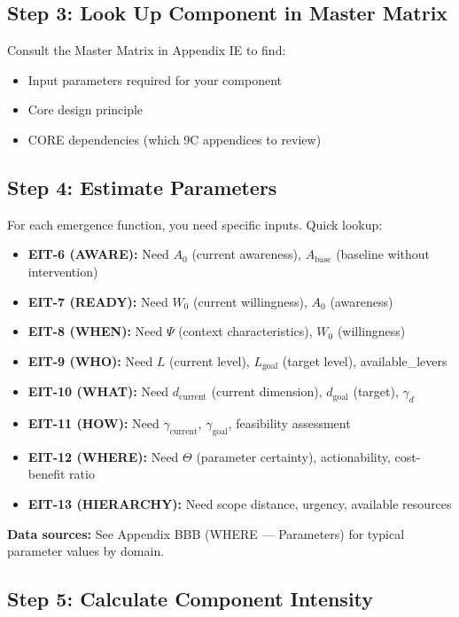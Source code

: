 \subsection{Step 3: Look Up Component in Master Matrix}

Consult the Master Matrix in Appendix IE to find:
\begin{itemize}[nosep]
\item Input parameters required for your component
\item Core design principle
\item CORE dependencies (which 9C appendices to review)
\end{itemize}

\subsection{Step 4: Estimate Parameters}

For each emergence function, you need specific inputs. Quick lookup:

\begin{itemize}
\item \textbf{EIT-6 (AWARE):} Need $A_0$ (current awareness), $A_{\text{base}}$ (baseline without intervention)
\item \textbf{EIT-7 (READY):} Need $W_0$ (current willingness), $A_0$ (awareness)
\item \textbf{EIT-8 (WHEN):} Need $\Psi$ (context characteristics), $W_0$ (willingness)
\item \textbf{EIT-9 (WHO):} Need $L$ (current level), $L_{\text{goal}}$ (target level), available\_levers
\item \textbf{EIT-10 (WHAT):} Need $d_{\text{current}}$ (current dimension), $d_{\text{goal}}$ (target), $\gamma_d$
\item \textbf{EIT-11 (HOW):} Need $\gamma_{\text{current}}$, $\gamma_{\text{goal}}$, feasibility assessment
\item \textbf{EIT-12 (WHERE):} Need $\Theta$ (parameter certainty), actionability, cost-benefit ratio
\item \textbf{EIT-13 (HIERARCHY):} Need scope distance, urgency, available resources
\end{itemize}

\textbf{Data sources:} See Appendix BBB (WHERE — Parameters) for typical parameter values by domain.

\subsection{Step 5: Calculate Component Intensity}

